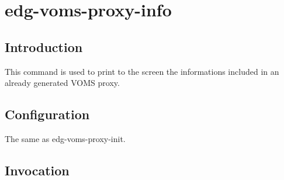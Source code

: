 \documentclass[a4paper]{book}
\begin{document}
\chapter{edg-voms-proxy-info}
\section{Introduction}
This command is used to print to the screen the informations included
in an already generated VOMS proxy.

\section{Configuration}
The same as edg-voms-proxy-init.

\section{Invocation}
\end{document}
